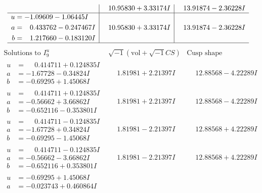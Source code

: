 \documentclass[1p]{elsarticle_modified}
\theoremstyle{definition}
\newcommand{\I}{\sqrt{-1}}
\begin{document}
$$\begin{array}{c|c|c}
 & \phantom{-}10.95830 + 3.33174 I & \phantom{-}13.91874 - 2.36228 I \\ \hline\begin{aligned}
u &= -1.09609 - 1.06445 I \\
a &= \phantom{-}0.433762 - 0.247467 I \\
b &= \phantom{-}1.217660 - 0.183120 I\end{aligned}
 & \phantom{-}10.95830 + 3.33174 I & \phantom{-}13.91874 - 2.36228 I\\
 \hline 
 \end{array}$$\newpage$$\begin{array}{c|c|c}  
\text{Solutions to }I^u_{9}& \I (\text{vol} + \sqrt{-1}CS) & \text{Cusp shape}\\
 \hline 
\begin{aligned}
u &= \phantom{-}0.414711 + 0.124835 I \\
a &= -1.67728 - 0.34824 I \\
b &= -0.69295 + 1.45068 I\end{aligned}
 & \phantom{-}1.81981 + 2.21397 I & \phantom{-}12.88568 - 4.22289 I \\ \hline\begin{aligned}
u &= \phantom{-}0.414711 + 0.124835 I \\
a &= -0.56662 + 3.66862 I \\
b &= -0.652116 - 0.353801 I\end{aligned}
 & \phantom{-}1.81981 + 2.21397 I & \phantom{-}12.88568 - 4.22289 I \\ \hline\begin{aligned}
u &= \phantom{-}0.414711 - 0.124835 I \\
a &= -1.67728 + 0.34824 I \\
b &= -0.69295 - 1.45068 I\end{aligned}
 & \phantom{-}1.81981 - 2.21397 I & \phantom{-}12.88568 + 4.22289 I \\ \hline\begin{aligned}
u &= \phantom{-}0.414711 - 0.124835 I \\
a &= -0.56662 - 3.66862 I \\
b &= -0.652116 + 0.353801 I\end{aligned}
 & \phantom{-}1.81981 - 2.21397 I & \phantom{-}12.88568 + 4.22289 I \\ \hline\begin{aligned}
u &= -0.69295 + 1.45068 I \\
a &= -0.023743 + 0.460864 I \\

\end{aligned}
\end{array}$$
\end{document}
